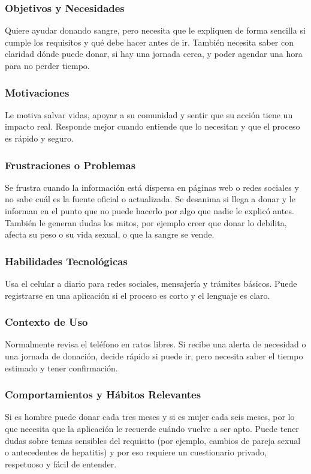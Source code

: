 \documentclass[12pt, a4paper]{article}
\begin{document}
\subsubsection{Objetivos y Necesidades}
Quiere ayudar donando sangre, pero necesita que le expliquen de forma sencilla si cumple los requisitos y qué debe hacer antes de ir. También necesita saber con claridad dónde puede donar, si hay una jornada cerca, y poder agendar una hora para no perder tiempo.

\subsubsection{Motivaciones}
Le motiva salvar vidas, apoyar a su comunidad y sentir que su acción tiene un impacto real. Responde mejor cuando entiende que lo necesitan y que el proceso es rápido y seguro.

\subsubsection{Frustraciones o Problemas}
Se frustra cuando la información está dispersa en páginas web o redes sociales y no sabe cuál es la fuente oficial o actualizada. Se desanima si llega a donar y le informan en el punto que no puede hacerlo por algo que nadie le explicó antes. También le generan dudas los mitos, por ejemplo creer que donar lo debilita, afecta su peso o su vida sexual, o que la sangre se vende.

\subsubsection{Habilidades Tecnológicas}
Usa el celular a diario para redes sociales, mensajería y trámites básicos. Puede registrarse en una aplicación si el proceso es corto y el lenguaje es claro.

\subsubsection{Contexto de Uso}
Normalmente revisa el teléfono en ratos libres. Si recibe una alerta de necesidad o una jornada de donación, decide rápido si puede ir, pero necesita saber el tiempo estimado y tener confirmación.

\subsubsection{Comportamientos y Hábitos Relevantes}
Si es hombre puede donar cada tres meses y si es mujer cada seis meses, por lo que necesita que la aplicación le recuerde cuándo vuelve a ser apto. Puede tener dudas sobre temas sensibles del requisito (por ejemplo, cambios de pareja sexual o antecedentes de hepatitis) y por eso requiere un cuestionario privado, respetuoso y fácil de entender.
\end{document}
